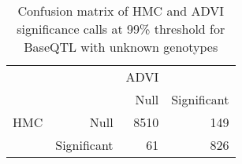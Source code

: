 \begin{table}[ht]
\centering
\caption{Confusion matrix of HMC and ADVI significance calls at 99\% threshold for BaseQTL with unknown genotypes} 
\label{tab:noGT-xtab-99}
\begin{tabular}{rr|rr}
   &  & ADVI &  \\ 
    &   & Null & Significant \\ 
   \hline
HMC & Null & 8510 & 149 \\ 
    & Significant & 61 & 826 \\ 
  \end{tabular}
\end{table}
